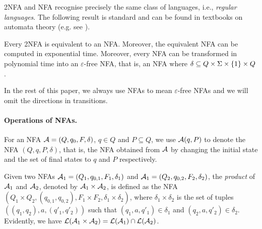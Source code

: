 2NFA and NFA recognise precisely the same class of languages, i.e., 
\emph{regular languages}. The following result is standard and can be found in textbooks on automata theory
(e.g. see \cite{Kozen-automata}). 

\begin{proposition}
	Every 2NFA is equivalent to an NFA. Moreover, the equivalent
    NFA can be computed in exponential time. Moreover, every NFA can be transformed in polynomial time into an $\varepsilon$-free NFA, that is, an NFA where $\delta\subseteq Q \times \Sigma\times   \{1\} \times Q $.
\end{proposition}

In the rest of this paper, we always use NFAs to mean $\varepsilon$-free NFAs and we will omit the directions in transitions.

\paragraph{Operations of NFAs.} For an NFA $\mathcal{A}=(Q, q_0, F, \delta)$, $q \in Q$ and $P \subseteq Q$, we use $\mathcal{A}(q, P)$ to denote the NFA $(Q, q, P, \delta)$, that is, the NFA obtained from $\mathcal{A}$ by changing the initial state and the set of final states to $q$ and $P$ respectively.

Given two NFAs $\mathcal{A}_1 = (Q_1, q_{0,1}, F_{1}, \delta_1)$ and $\mathcal{A}_1 = (Q_2, q_{0,2}, F_2, \delta_2)$, the \emph{product} of $\mathcal{A}_1$ and $\mathcal{A}_2$, denoted by $\mathcal{A}_1 \times \mathcal{A}_2$, is defined as the NFA $(Q_1 \times Q_2, (q_{0,1}, q_{0,2}), F_1 \times F_2, \delta_1 \times \delta_2)$, where $\delta_1 \times \delta_2$ is the set of tuples $((q_1,q_2), a, (q'_1, q'_2))$ such that $(q_1, a, q'_1) \in \delta_1$ and $(q_2, a, q'_2) \in \delta_2$. Evidently, we have $\mathcal{L}(\mathcal{A}_1 \times \mathcal{A}_2) = \mathcal{L}(\mathcal{A}_1) \cap \mathcal{L}(\mathcal{A}_2)$.




 
 
